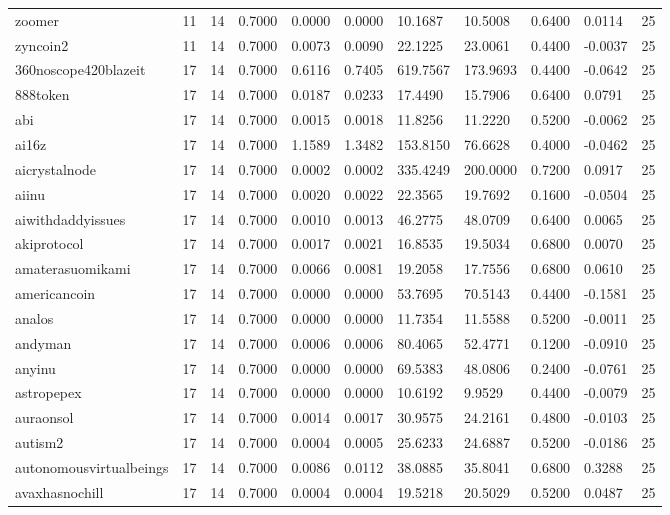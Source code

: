 \begin{table}[htbp]
\begin{tabular}{lllllllllll}
zoomer & 11 & 14 & 0.7000 & 0.0000 & 0.0000 & 10.1687 & 10.5008 & 0.6400 & 0.0114 & 25 \\
zyncoin2 & 11 & 14 & 0.7000 & 0.0073 & 0.0090 & 22.1225 & 23.0061 & 0.4400 & -0.0037 & 25 \\
360noscope420blazeit & 17 & 14 & 0.7000 & 0.6116 & 0.7405 & 619.7567 & 173.9693 & 0.4400 & -0.0642 & 25 \\
888token & 17 & 14 & 0.7000 & 0.0187 & 0.0233 & 17.4490 & 15.7906 & 0.6400 & 0.0791 & 25 \\
abi & 17 & 14 & 0.7000 & 0.0015 & 0.0018 & 11.8256 & 11.2220 & 0.5200 & -0.0062 & 25 \\
ai16z & 17 & 14 & 0.7000 & 1.1589 & 1.3482 & 153.8150 & 76.6628 & 0.4000 & -0.0462 & 25 \\
aicrystalnode & 17 & 14 & 0.7000 & 0.0002 & 0.0002 & 335.4249 & 200.0000 & 0.7200 & 0.0917 & 25 \\
aiinu & 17 & 14 & 0.7000 & 0.0020 & 0.0022 & 22.3565 & 19.7692 & 0.1600 & -0.0504 & 25 \\
aiwithdaddyissues & 17 & 14 & 0.7000 & 0.0010 & 0.0013 & 46.2775 & 48.0709 & 0.6400 & 0.0065 & 25 \\
akiprotocol & 17 & 14 & 0.7000 & 0.0017 & 0.0021 & 16.8535 & 19.5034 & 0.6800 & 0.0070 & 25 \\
amaterasuomikami & 17 & 14 & 0.7000 & 0.0066 & 0.0081 & 19.2058 & 17.7556 & 0.6800 & 0.0610 & 25 \\
americancoin & 17 & 14 & 0.7000 & 0.0000 & 0.0000 & 53.7695 & 70.5143 & 0.4400 & -0.1581 & 25 \\
analos & 17 & 14 & 0.7000 & 0.0000 & 0.0000 & 11.7354 & 11.5588 & 0.5200 & -0.0011 & 25 \\
andyman & 17 & 14 & 0.7000 & 0.0006 & 0.0006 & 80.4065 & 52.4771 & 0.1200 & -0.0910 & 25 \\
anyinu & 17 & 14 & 0.7000 & 0.0000 & 0.0000 & 69.5383 & 48.0806 & 0.2400 & -0.0761 & 25 \\
astropepex & 17 & 14 & 0.7000 & 0.0000 & 0.0000 & 10.6192 & 9.9529 & 0.4400 & -0.0079 & 25 \\
auraonsol & 17 & 14 & 0.7000 & 0.0014 & 0.0017 & 30.9575 & 24.2161 & 0.4800 & -0.0103 & 25 \\
autism2 & 17 & 14 & 0.7000 & 0.0004 & 0.0005 & 25.6233 & 24.6887 & 0.5200 & -0.0186 & 25 \\
autonomousvirtualbeings & 17 & 14 & 0.7000 & 0.0086 & 0.0112 & 38.0885 & 35.8041 & 0.6800 & 0.3288 & 25 \\
avaxhasnochill & 17 & 14 & 0.7000 & 0.0004 & 0.0004 & 19.5218 & 20.5029 & 0.5200 & 0.0487 & 25 \\

\end{tabular}
\end{table}
